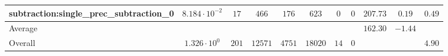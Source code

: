 \begin{tabular}{|l|c|c|c|c|c|c|c|c|c|c|}
subtraction:single\_prec\_subtraction\_0         & $ 8.184 \cdot 10^{-2} $ & $ 17     $ & $ 466   $ & $ 176  $ & $ 623   $ & $ 0  $ & $ 0 $ & $ 207.73      $ & $ 0.19    $ & $ 0.49    $ \\
\hline
Average                                          & $                     $ & $        $ & $       $ & $      $ & $       $ & $    $ & $   $ & $ 162.30      $ & $ -1.44   $ & $         $ \\
\hline
Overall                                          & $ 1.326 \cdot 10^{0}  $ & $ 201    $ & $ 12571 $ & $ 4751 $ & $ 18020 $ & $ 14 $ & $ 0 $ & $             $ & $         $ & $ 4.90    $ \\
\hline
\end{tabular}
